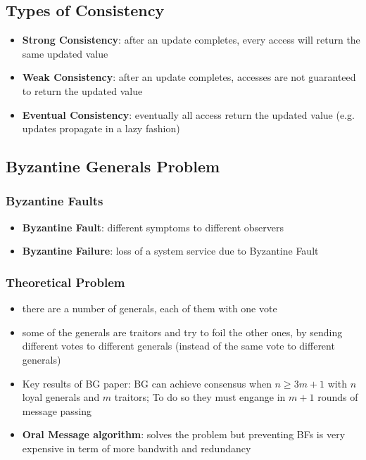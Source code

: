 \documentclass[a4paper]{article}
\begin{document}
\begin{multicols}{3}
\subsection{Types of Consistency}
\begin{itemize}
    \item \textbf{Strong Consistency}: after an update completes, every access will return the same updated value
    \item \textbf{Weak Consistency}: after an update completes, accesses are not guaranteed to return the updated value
    \item \textbf{Eventual Consistency}: eventually all access return the updated value (e.g. updates propagate in a lazy fashion)
\end{itemize}

\subsection{Byzantine Generals Problem}
\subsubsection{Byzantine Faults}
\begin{itemize}
    \item \textbf{Byzantine Fault}: different symptoms to different observers
    \item \textbf{Byzantine Failure}: loss of a system service due to Byzantine Fault
\end{itemize}

\subsubsection{Theoretical Problem}
\begin{itemize}
    \item there are a number of generals, each of them with one vote
    \item some of the generals are traitors and try to foil the other ones, by sending different votes to different generals (instead of the same vote to different generals)
    \item Key results of BG paper: BG can achieve consensus when $n\geq3m+1$ with $n$ loyal generals and $m$ traitors; To do so they must engange in $m+1$ rounds of message passing
    \item \textbf{Oral Message algorithm}: solves the problem but preventing BFs is very expensive in term of more bandwith and redundancy
\end{itemize}


\end{multicols}
\end{document}

